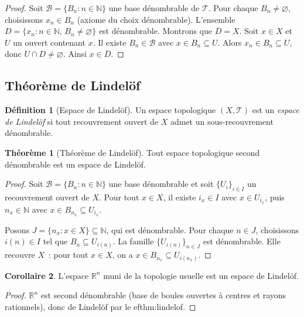 \documentclass[12pt,a4paper,openany]{book}
\theoremstyle{definition}
\newtheorem{definition}{Définition}[chapter]
\theoremstyle{cours}
\newtheorem{theoreme}{Théorème}[chapter]
\newtheorem{corollaire}[theoreme]{Corollaire}
\theoremstyle{coursnormal}
\newcommand{\N}{\mathbb{N}}
\newcommand{\R}{\mathbb{R}}
\newcommand{\T}{\mathcal{T}}
\newcommand{\B}{\mathcal{B}}
\begin{document}
\begin{proof}
  Soit $\B=\{B_n : n\in\N\}$ une base dénombrable de $\T$. Pour chaque
  $B_n\neq\varnothing$, choisissons $x_n\in B_n$ (axiome du choix dénombrable).
  L'ensemble $D=\{x_n : n\in\N,\, B_n\neq\varnothing\}$ est dénombrable.
  Montrons que $\overline{D}=X$. Soit $x\in X$ et $U$ un ouvert contenant $x$.
  Il existe $B_n\in\B$ avec $x\in B_n\subseteq U$. Alors $x_n\in B_n\subseteq U$,
  donc $U\cap D\neq\varnothing$. Ainsi $x\in\overline{D}$.
\end{proof}

\subsection{Théorème de Lindelöf}\label{subsec:lindelof}

\begin{definition}[Espace de Lindelöf]\label{def:lindelof}
  Un espace topologique $(X,\T)$ est un \emph{espace de
  Lindelöf} si tout recouvrement ouvert de $X$
  admet un sous-recouvrement dénombrable.
\end{definition}

\begin{theoreme}[Théorème de Lindelöf]\label{thm:lindelof}
  Tout espace topologique second dénombrable est un espace de Lindelöf.
\end{theoreme}

\begin{proof}
  Soit $\B = \{B_n : n\in\N\}$ une base dénombrable et soit
  $\{U_i\}_{i\in I}$ un recouvrement ouvert de $X$. Pour tout $x\in X$, il
  existe $i_x\in I$ avec $x\in U_{i_x}$, puis $n_x\in\N$ avec
  $x\in B_{n_x}\subseteq U_{i_x}$.

  Posons $J = \{n_x : x\in X\}\subseteq\N$, qui est dénombrable. Pour chaque
  $n\in J$, choisissons $i(n)\in I$ tel que $B_n\subseteq U_{i(n)}$. La
  famille $\{U_{i(n)}\}_{n\in J}$ est dénombrable. Elle recouvre $X$~: pour
  tout $x\in X$, on a $x\in B_{n_x}\subseteq U_{i(n_x)}$.
\end{proof}

\begin{corollaire}\label{cor:cor:Rn-lindelof}
  L'espace $\R^n$ muni de la topologie usuelle est un espace de Lindelöf.
\end{corollaire}

\begin{proof}
  $\R^n$ est second dénombrable (base de boules ouvertes à centres et rayons
  rationnels), donc de Lindelöf par le 
ef{thm:lindelof}.
\end{proof}
\end{document}

